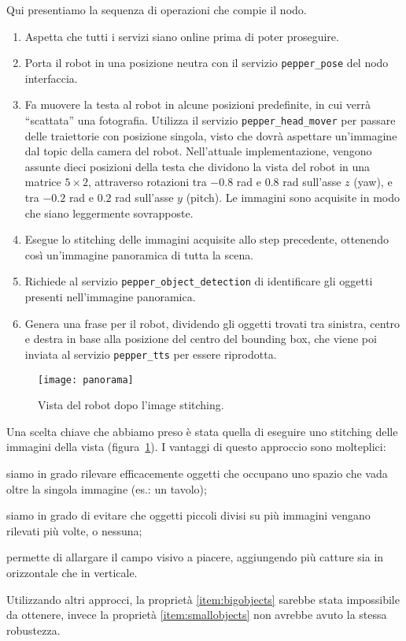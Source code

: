 Qui presentiamo la sequenza di operazioni che compie il nodo.
\begin{enumerate}
	\item Aspetta che tutti i servizi siano online prima di poter proseguire.
	\item Porta il robot in una posizione neutra con il servizio \verb|pepper_pose| del nodo interfaccia. 
	\item Fa muovere la testa al robot in alcune posizioni predefinite, in cui verrà ``scattata'' una fotografia. Utilizza il servizio \verb|pepper_head_mover| per passare delle traiettorie con posizione singola, visto che dovrà aspettare un'immagine dal topic della camera del robot. Nell'attuale implementazione, vengono assunte dieci posizioni della testa che dividono la vista del robot in una matrice $5 \times 2$, attraverso rotazioni tra $-0.8$ rad e $0.8$ rad sull'asse $z$ (yaw), e tra $-0.2$ rad e $0.2$ rad sull'asse $y$ (pitch). Le immagini sono acquisite in modo che siano leggermente sovrapposte.
	\item Esegue lo stitching delle immagini acquisite allo step precedente, ottenendo così un'immagine panoramica di tutta la scena.
	\item Richiede al servizio \verb|pepper_object_detection| di identificare gli oggetti presenti nell'immagine panoramica.
	\item Genera una frase per il robot, dividendo gli oggetti trovati tra sinistra, centro e destra in base alla posizione del centro del bounding box, che viene poi inviata al servizio \verb|pepper_tts| per essere riprodotta.
\end{enumerate}

\begin{figure}
	\centering
	\texttt{[image: panorama]}
	\caption{Vista del robot dopo l'image stitching.}\label{fig:panorama}
\end{figure}

Una scelta chiave che abbiamo preso è stata quella di eseguire uno stitching delle immagini della vista (figura~\ref{fig:panorama}). I vantaggi di questo approccio sono molteplici: \begin{enumerate*}[label={(\arabic*)}] \item siamo in grado rilevare efficacemente oggetti che occupano uno spazio che vada oltre la singola immagine (es.\@: un tavolo)\label{item:bigobjects}; \item siamo in grado di evitare che oggetti piccoli divisi su più immagini vengano rilevati più volte, o nessuna\label{item:smallobjects}; \item permette di allargare il campo visivo a piacere, aggiungendo più catture sia in orizzontale che in verticale.\end{enumerate*} Utilizzando altri approcci, la proprietà \ref{item:bigobjects} sarebbe stata impossibile da ottenere, invece la proprietà \ref{item:smallobjects} non avrebbe avuto la stessa robustezza.

